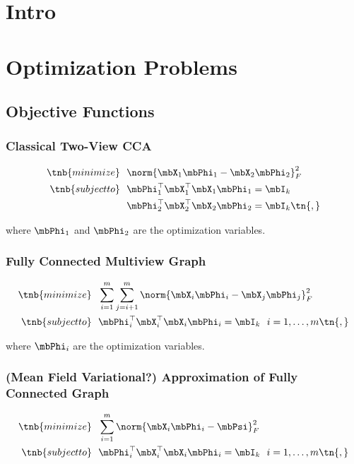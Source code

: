 \documentclass{article}
\begin{document}
\section{Intro} \label{sec:intro}
\section{Optimization Problems} \label{sec:model}

	\subsection{Objective Functions} \label{subsec:objective}
	\subsubsection{Classical Two-View CCA} \label{subsubsec:classicalcca}
	
	\begin{align*}
		\tnb{minimize}&\ \ \norm{\mbX_1 \mbPhi_1 - \mbX_2 \mbPhi_2}_F^2\\
		\tnb{subject to}&\ \  \mbPhi_1^{\top}\mbX_1^{\top}\mbX_1\mbPhi_1 = \mbI_k\\
		&\ \ \mbPhi_2^{\top}\mbX_2^{\top}\mbX_2\mbPhi_2 = \mbI_k \tn{,}
	\end{align*}
	
	\noindent where $\mbPhi_1$ and $\mbPhi_2$ are the optimization variables.
	
	\subsubsection{Fully Connected Multiview Graph} \label{subsubsec:fcgraph}
	
	\begin{align*}
		\tnb{minimize}&\ \ \sum_{i=1}^m \sum_{j=i+1}^m \norm{\mbX_i \mbPhi_i - \mbX_j \mbPhi_j}_F^2\\
		\tnb{subject to}&\ \  \mbPhi_i^{\top}\mbX_i^{\top}\mbX_i\mbPhi_i = \mbI_k\ \ i=1,\ldots,m \tn{,}
	\end{align*}
	
	\noindent where $\mbPhi_i$ are the optimization variables.
	
	\subsubsection{(Mean Field Variational?) Approximation of Fully Connected Graph} \label{subsubsec:approxfcgraph}
	
	\begin{align*}
		\tnb{minimize}&\ \ \sum_{i=1}^m \norm{\mbX_i \mbPhi_i - \mbPsi}_F^2\\
		\tnb{subject to}&\ \  \mbPhi_i^{\top}\mbX_i^{\top}\mbX_i\mbPhi_i = \mbI_k\ \ i=1,\ldots,m \tn{,}
	\end{align*}
	
\end{document}
